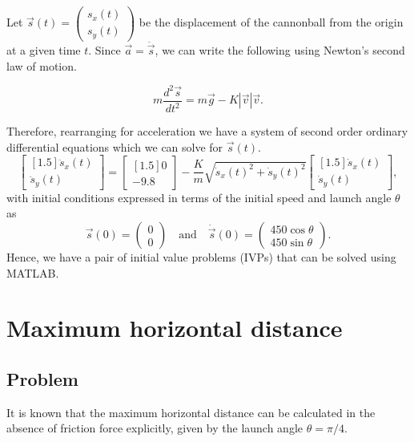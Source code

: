\documentclass[11pt]{report}
\begin{document}
Let $\vec{s}(t)= \begin{pmatrix} s_x(t) \\ s_y(t) \end{pmatrix}$ be the displacement of the cannonball from the origin at a given time $t$. Since $\vec{a}=\ddot{\vec{s}}$, we can write the following using Newton's second law of motion. 

\begin{equation}
	m\dfrac{d^2 \vec{s}}{dt^2} = m\vec{g} - K|\vec{v}|\vec{v} \label{eq:n2l}.
\end{equation}

Therefore, rearranging for acceleration we have a system of second order ordinary differential equations which we can solve for $\vec{s}(t)$.
\begin{equation}
	\begin{bmatrix}[1.5]
	\ddot{s}_x(t) \\ \ddot{s}_y(t)
	\end{bmatrix}
	=
	\begin{bmatrix}[1.5]
	0 \\ -9.8
	\end{bmatrix}
	- \dfrac{K}{m}\sqrt{\dot{s}_x(t)^2 + \dot{s}_y(t)^2}
	\begin{bmatrix}[1.5]
	\dot{s}_x(t) \\ \dot{s}_y(t)
	\end{bmatrix},
	\label{eq:ode}
\end{equation}
with initial conditions expressed in terms of the initial speed and launch angle $\theta$ as
\begin{equation}
	\vec{s}(0) = \begin{pmatrix} 0 \\ 0 \end{pmatrix} \quad\text{and}\quad \dot{\vec{s}}(0) = \begin{pmatrix} 450\cos{\theta} \\ 450\sin{\theta} \end{pmatrix}.
	\label{eq:ic}
\end{equation}
Hence, we have a pair of initial value problems (IVPs) that can be solved using MATLAB.

\chapter{Maximum horizontal distance}
\section*{Problem}
It is known that the maximum horizontal distance can be calculated in the absence of friction force explicitly, given by the launch angle $\theta=\pi/4$.\\
\end{document}
